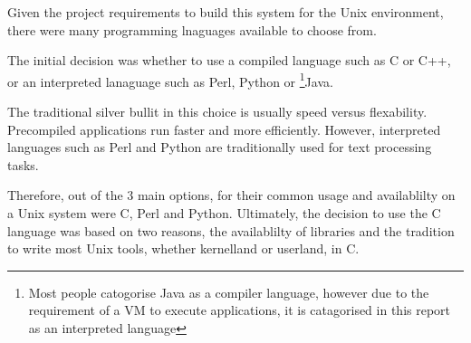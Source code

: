 
Given the project requirements to build this system for the Unix
environment, there were many programming lnaguages available to choose
from.


The initial decision was whether to use a compiled language such as C or
C++, or an interpreted lanaguage such as Perl, Python or
\footnote{Most people catogorise Java as a compiler language,
however due to the requirement of a VM to execute applications, it is
catagorised in this report as an interpreted language}{Java}. 


The traditional silver bullit in this choice is usually speed versus 
flexability. Precompiled applications run faster and more efficiently. 
However, interpreted languages such as Perl and Python are traditionally
used for text processing tasks. 


Therefore, out of the 3 main options, for their common usage and
availablilty on a Unix system were C, Perl and Python. Ultimately, the
decision to use the C language was based on two reasons, the
availablilty of libraries and the tradition to write most Unix tools,
whether kernelland or userland, in C.
